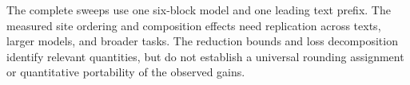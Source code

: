The complete sweeps use one six-block model and one leading text prefix. The
measured site ordering and composition effects need replication across texts,
larger models, and broader tasks. The reduction bounds and loss decomposition
identify relevant quantities, but do not establish a universal rounding
assignment or quantitative portability of the observed gains.
